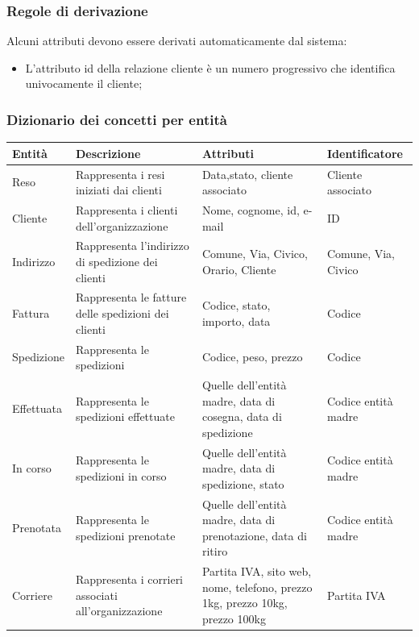 \documentclass[a4paper,12pt]{article}
\begin{document}
\subsubsection*{Regole di derivazione}
Alcuni attributi devono essere derivati automaticamente dal sistema:
\begin{itemize}
  \item L'attributo id della relazione cliente è un numero progressivo che identifica univocamente il cliente;
  
\end{itemize}
\subsubsection{Dizionario dei concetti per entità}
\begin{table}[H]
	\centering
	\begin{tabularx}{\dimexpr{}\arrayrulewidth}{|*{4}{Y|}} %
		\hline
		\textbf{Entità} & \textbf{Descrizione} & \textbf{Attributi} & \textbf{Identificatore} \\ \hline
		 Reso & Rappresenta i resi iniziati dai clienti & Data,stato, cliente associato & Cliente associato \\
		 \hline
		 Cliente & Rappresenta i clienti dell'organizzazione & Nome, cognome, id, e-mail & ID \\
		\hline 
		Indirizzo & Rappresenta l'indirizzo di spedizione dei clienti & Comune, Via, Civico, Orario, Cliente & Comune, Via, Civico \\ 
		\hline
		Fattura & Rappresenta le fatture delle spedizioni dei clienti & Codice, stato, importo, data & Codice\\
		\hline
		Spedizione & Rappresenta le spedizioni & Codice, peso, prezzo & Codice \\ 
		\hline
		Effettuata & Rappresenta le spedizioni effettuate & Quelle dell'entità madre, data di cosegna, data di spedizione & Codice entità madre \\
		\hline
		In corso & Rappresenta le spedizioni in corso & Quelle dell'entità madre, data di spedizione, stato & Codice entità madre \\
		\hline
		Prenotata & Rappresenta le spedizioni prenotate & Quelle dell'entità madre, data di prenotazione, data di ritiro & Codice entità madre \\
		\hline
		Corriere & Rappresenta i corrieri associati all'organizzazione & Partita IVA, sito web, nome, telefono, prezzo 1kg, prezzo 10kg, prezzo 100kg & Partita IVA \\
		\hline 
	\end{tabularx}
\end{table}
\end{document}

